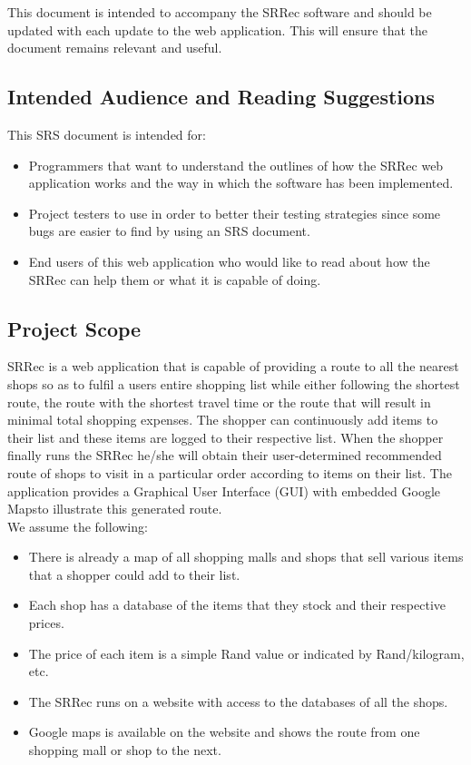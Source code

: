 \documentclass[10pt, a4paper, onecolumn]{scrartcl}
\begin{document}
			This document is intended to accompany the SRRec software and should be updated with each update to the web application. This will ensure that the document remains relevant and useful.
		
		\subsection{Intended Audience and Reading Suggestions}
		
			This SRS document is intended for:
			\begin{itemize}
				\item Programmers that want to understand the outlines of how the SRRec web application works and the way in which the software has been implemented.
				\item Project testers to use in order to better their testing strategies since some bugs are easier to find by using an SRS document.
				\item End users of this web application who would like to read about how the SRRec can help them or what it is capable of doing.
			\end{itemize}
		
		\subsection{Project Scope}
		
			SRRec is a web application that is capable of providing a route to all the nearest shops so as to fulfil a users entire shopping list while either following the shortest route, the route with the shortest travel time or the route that will result in minimal total shopping expenses. The shopper can continuously add items to their list and these items are logged to their respective list. When the shopper finally runs the SRRec he/she will obtain their user-determined recommended route of shops to visit in a particular order according to items on their list. The application provides a Graphical User Interface (GUI) with embedded Google Mapsto illustrate this generated route. \\
		
			We assume the following:
			\begin{itemize}
				\item There is already a map of all shopping malls and shops that sell various items that a shopper could add to their list.
				\item Each shop has a database of the items that they stock and their respective prices.
				\item The price of each item is a simple Rand value or indicated by Rand/kilogram, etc.
				\item The SRRec runs on a website with access to the databases of all the shops.
				\item Google maps is available on the website and shows the route from one shopping mall or shop to the next.
			\end{itemize}
			
\end{document}
